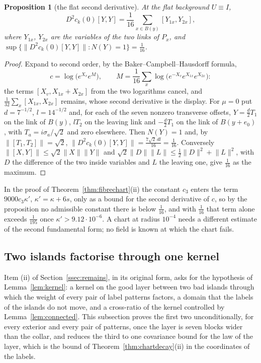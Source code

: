 \documentclass[11pt]{amsart}
\newtheorem{proposition}[theorem]{Proposition}
\theoremstyle{definition}
\theoremstyle{remark}
\numberwithin{equation}{section}
\begin{document}
\begin{proposition}[the flat second derivative]\label{prop:flatsecond}
At the flat background $U\equiv I$,
\[
D^2c_k(0)[Y,Y]=\frac1{16}\sum_{x\in B(y)}[Y_{1x},Y_{2x}],
\]
where $Y_{1x}$, $Y_{2x}$ are the variables of the two links of $P_x$, and
$\sup\{\lVert D^2c_k(0)[Y,Y]\rVert:N(Y)=1\}=\frac1{16}$.
\end{proposition}

\begin{proof}
Expand to second order, by the Baker--Campbell--Hausdorff formula,
\[
c=\log\bigl(e^{X_v}e^M\bigr),\qquad M=\frac1{16}\sum_x\log\bigl(e^{-X_v}
e^{X_{1x}}e^{X_{2x}}\bigr):
\]
the
terms $[X_v,X_{1x}+X_{2x}]$ from the two logarithms cancel, and
$\frac1{32}\sum_x[X_{1x},X_{2x}]$ remains, whose second derivative is the
display. For $\mu=0$ put $d=7^{-1/2}$, $l=14^{-1/2}$ and, for each of the
seven nonzero transverse offsets, $Y=\frac d2T_1$ on the link of
$B(y)$, $lT_2$ on the leaving link and $-\frac d2T_1$ on the link of
$B(y+e_0)$, with $T_a=i\sigma_a/\sqrt2$ and zero elsewhere. Then $N(Y)=1$ and,
by $\lVert[T_1,T_2]\rVert=\sqrt2$, $\lVert D^2c_k(0)[Y,Y]\rVert=\frac{7\sqrt2
\,dl}{16}=\frac1{16}$. Conversely $\lVert[X,Y]\rVert\le\sqrt2\lVert X\rVert
\lVert Y\rVert$ and $\sqrt2\lVert D\rVert\lVert L\rVert\le\frac12\lVert D
\rVert^2+\lVert L\rVert^2$, with $D$ the difference of the two inside
variables and $L$ the leaving one, give $\frac1{16}$ as the maximum.
\end{proof}

In the proof of Theorem~\ref{thm:fibrechart}(ii) the constant $c_3$
enters the term $9000c_3\kappa'$, $\kappa'=\kappa+6s$, only as a bound for the
second derivative of $c$, so by the proposition no admissible constant
there is below $\frac1{16}$, and with $\frac1{16}$ that term alone exceeds
$\frac1{195}$ once $\kappa'>9.12\cdot10^{-6}$. A chart at radius $10^{-4}$
needs a different estimate of the second fundamental form; no field is
known at which the chart fails.

\subsection{Two islands factorise through one kernel}\label{ssec:factorisation}

Item (ii) of Section~\ref{ssec:remains}, in its original form, asks for the
hypothesis of Lemma~\ref{lem:kernel}: a kernel on the good layer between
two bad islands through which the weight of every pair of label patterns
factors, a domain that the labels of the islands do not move, and a
cross-ratio of the kernel controlled by Lemma~\ref{lem:connected}. This
subsection proves the first two unconditionally, for every exterior and
every pair of patterns, once the layer is seven blocks wider than the
collar, and reduces the third to one covariance bound for the law of the
layer, which is the bound of Theorem~\ref{thm:chartdecay}(ii) in the
coordinates of the labels.
\end{document}
